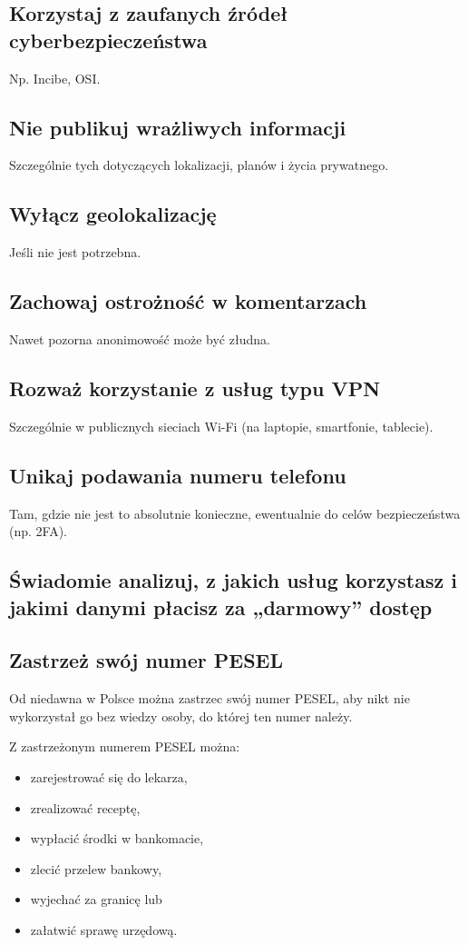 \subsection{Korzystaj z zaufanych źródeł cyberbezpieczeństwa}
Np. Incibe, OSI.

\subsection{Nie publikuj wrażliwych informacji}
Szczególnie tych dotyczących lokalizacji, planów i życia prywatnego.

\subsection{Wyłącz geolokalizację}
Jeśli nie jest potrzebna.

\subsection{Zachowaj ostrożność w komentarzach}
Nawet pozorna anonimowość może być złudna.

\subsection{Rozważ korzystanie z usług typu VPN}
Szczególnie w publicznych sieciach Wi-Fi (na laptopie, smartfonie, tablecie).

\subsection{Unikaj podawania numeru telefonu}
Tam, gdzie nie jest to absolutnie konieczne, ewentualnie do celów bezpieczeństwa (np. 2FA).

\subsection{Świadomie analizuj, z jakich usług korzystasz i jakimi danymi płacisz za „darmowy” dostęp}

\subsection{Zastrzeż swój numer PESEL}
Od niedawna w Polsce można zastrzec swój numer PESEL, aby nikt nie wykorzystał go bez wiedzy osoby, do której ten numer należy.

Z zastrzeżonym numerem PESEL można:
\begin{itemize}
    \item zarejestrować się do lekarza,
    \item zrealizować receptę,
    \item wypłacić środki w bankomacie,
    \item zlecić przelew bankowy,
    \item wyjechać za granicę lub
    \item załatwić sprawę urzędową.
\end{itemize}


